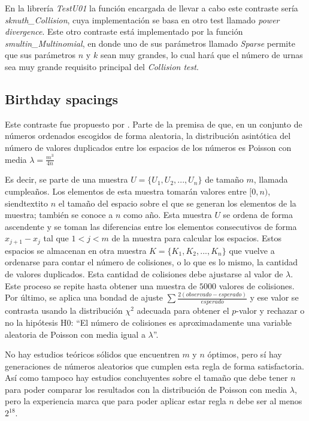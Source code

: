 \documentclass{article}
\begin{document}
En la librería \emph{TestU01} la función encargada de llevar a cabo este contraste sería \emph{sknuth\_Collision}, cuya implementación se basa en otro test llamado \emph{power divergence}. Este otro contraste está implementado por la función \emph{smultin\_Multinomial}, en donde uno de sus parámetros llamado \emph{Sparse} permite que sus parámetros $n$ y $k$ sean muy grandes, lo cual hará que el número de urnas sea muy grande requisito principal del \emph{Collision test}.

\subsection{Birthday spacings}

Este contraste fue propuesto por \citet{Marsaglia19853}. Parte de la premisa de que, en un conjunto de números ordenados escogidos de forma aleatoria, la distribución asintótica del número de valores duplicados entre los espacios de los números es Poisson con media $\lambda=\frac{m^3}{4n}$

Es decir, se parte de una muestra $U = \{U_1,U_2,...,U_n\}$ de tamaño $m$, llamada cumpleaños. Los elementos de esta muestra tomarán valores entre $[0, n)$, siendtextito $n$ el tamaño del espacio sobre el que se generan los elementos de la muestra; también se conoce a $n$ como año. Esta muestra $U$ se ordena de forma ascendente y se toman las diferencias entre los elementos consecutivos de forma $x_{j+1}-x_j$ tal que $1 < j < m$ de la muestra para calcular los espacios. Estos espacios se almacenan en otra muestra $K = \{K_1,K_2,...,K_n\}$ que vuelve a ordenarse para contar el número de colisiones, o lo que es lo mismo, la cantidad de valores duplicados. Esta cantidad de colisiones debe ajustarse al valor de $\lambda$. Este proceso se repite hasta obtener una muestra de $5000$ valores de colisiones. Por último, se aplica una bondad de ajuste $\sum \frac{2(observado-esperado)}{esperado}$ y ese valor se contrasta usando la distribución \(\chi^2\) adecuada para obtener el $p$-valor y rechazar o no la hipótesis H0: “El número de colisiones es aproximadamente una variable aleatoria de Poisson con media igual a $\lambda$”. 

No hay estudios teóricos sólidos que encuentren $m$ y $n$ óptimos, pero sí hay generaciones de números aleatorios que cumplen esta regla de forma satisfactoria. Así como tampoco hay estudios concluyentes sobre el tamaño que debe tener $n$ para poder comparar los resultados con la distribución de Poisson con media $\lambda$, pero la experiencia marca que para poder aplicar estar regla $n$ debe ser al menos $2^{18}$.  
\end{document}

